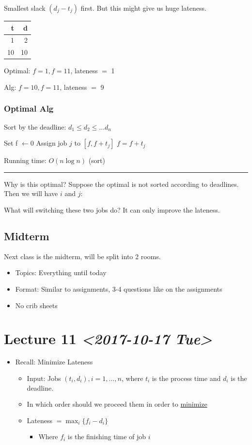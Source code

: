\documentclass[11pt]{article}
\begin{document}
Smallest slack \((d_j-t_j)\) first. But this might give us huge lateness.
\begin{center}
\begin{tabular}{rr}
t & d\\
\hline
1 & 2\\
10 & 10\\
\end{tabular}
\end{center}
Optimal: \(f=1, f=11\), lateness \(=\) 1

Alg: \(f=10, f=11\), lateness \(=\) 9
\subsubsection{Optimal Alg}
\label{sec:org5a6864c}
Sort by the deadline: \(d_1 \leq d_2 \leq \ldots d_n\)
\begin{algorithmic}
  \State Set f $\gets 0$
  \State Assign job $j$ to $[f,f+t_j]$
  \State $f=f+t_j$
  \EndFor
\end{algorithmic}
Running time: \(O(n \log n)\) (sort)

\noindent\rule{\textwidth}{0.5pt}
Why is this optimal? Suppose the optimal is not sorted according to deadlines. Then we will have \(i\) and \(j\): 

What will switching these two jobs do? It can only improve the lateness. 
\subsection{Midterm}
\label{sec:org39bb399}
Next class is the midterm, will be split into 2 rooms.
\begin{itemize}
\item Topics: Everything until today
\item Format: Similar to assignments, 3-4 questions like on the assignments
\item No crib sheets
\end{itemize}
\section{Lecture 11 \textit{<2017-10-17 Tue>}}
\label{sec:orge740b2f}
\begin{itemize}
\item Recall: Minimize Lateness
\begin{itemize}
\item Input: Jobs \((t_i, d_i), i=1,\ldots,n\), where \(t_i\) is the process time and \(d_i\) is the deadline.
\item In which order should we proceed them in order to \uline{minimize}
\item Lateness \(=\max_i \{f_i - d_i\}\)
\begin{itemize}
\item Where \(f_i\) is the finishing time of job \(i\)
\end{itemize}
\end{itemize}
\end{itemize}
\end{document}
